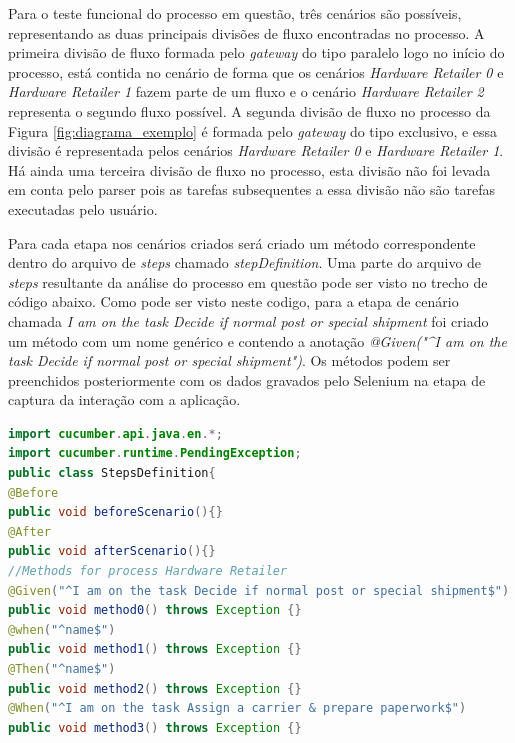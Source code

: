 \documentclass[12pt]{article}
\begin{document}
Para o teste funcional do processo em questão, três cenários são possíveis, representando as duas principais divisões de fluxo encontradas no processo. A primeira divisão de fluxo formada pelo \emph{gateway} do tipo paralelo logo no início do processo, está contida no cenário de forma que os cenários \emph{Hardware Retailer 0} e \emph{Hardware Retailer 1} fazem parte de um fluxo e o cenário \emph{Hardware Retailer 2} representa o segundo fluxo possível. A segunda divisão de fluxo no processo da Figura \ref{fig:diagrama_exemplo} é formada pelo \emph{gateway} do tipo exclusivo, e essa divisão é representada pelos cenários \emph{Hardware Retailer 0} e \emph{Hardware Retailer 1}. Há ainda uma terceira divisão de fluxo no processo, esta divisão não foi levada em conta pelo parser pois as tarefas subsequentes a essa divisão não são tarefas executadas pelo usuário.



Para cada etapa nos cenários criados será criado um método correspondente dentro do arquivo de \emph{steps} chamado \emph{stepDefinition}. Uma parte do arquivo de \emph{steps} resultante da análise do processo em questão pode ser visto no trecho de código abaixo. Como pode ser visto neste codigo, para a etapa de cenário chamada \emph{I am on the task Decide if normal post or special shipment} foi criado um método com um nome genérico e contendo a anotação \emph{@Given("\^{}I am on the task Decide if normal post or special shipment\textdollar{}")}. Os métodos podem ser preenchidos posteriormente com os dados gravados pelo Selenium na etapa de captura da interação com a aplicação.

\begin{lstlisting}[language=Java]
import cucumber.api.java.en.*;
import cucumber.runtime.PendingException;
public class StepsDefinition{
@Before
public void beforeScenario(){}
@After
public void afterScenario(){} 
//Methods for process Hardware Retailer
@Given("^I am on the task Decide if normal post or special shipment$") 
public void method0() throws Exception {} 
@when("^name$") 
public void method1() throws Exception {} 
@Then("^name$") 
public void method2() throws Exception {} 
@When("^I am on the task Assign a carrier & prepare paperwork$") 
public void method3() throws Exception {} 
\end{lstlisting}
\end{document}
